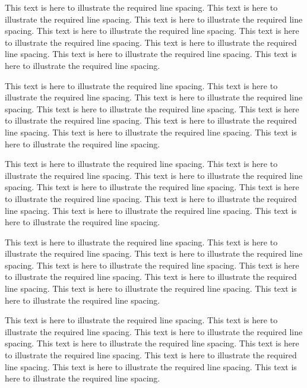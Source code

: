 \documentclass[12pt]{article}
\begin{document}
This text is here to illustrate the required line spacing. This text is here to illustrate the required line spacing. This text is here to illustrate the required line spacing. This text is here to illustrate the required line spacing. This text is here to illustrate the required line spacing. This text is here to illustrate the required line spacing. This text is here to illustrate the required line spacing. This text is here to illustrate the required line spacing.

This text is here to illustrate the required line spacing. This text is here to illustrate the required line spacing. This text is here to illustrate the required line spacing. This text is here to illustrate the required line spacing. This text is here to illustrate the required line spacing. This text is here to illustrate the required line spacing. This text is here to illustrate the required line spacing. This text is here to illustrate the required line spacing.

This text is here to illustrate the required line spacing. This text is here to illustrate the required line spacing. This text is here to illustrate the required line spacing. This text is here to illustrate the required line spacing. This text is here to illustrate the required line spacing. This text is here to illustrate the required line spacing. This text is here to illustrate the required line spacing. This text is here to illustrate the required line spacing.

This text is here to illustrate the required line spacing. This text is here to illustrate the required line spacing. This text is here to illustrate the required line spacing. This text is here to illustrate the required line spacing. This text is here to illustrate the required line spacing. This text is here to illustrate the required line spacing. This text is here to illustrate the required line spacing. This text is here to illustrate the required line spacing.

This text is here to illustrate the required line spacing. This text is here to illustrate the required line spacing. This text is here to illustrate the required line spacing. This text is here to illustrate the required line spacing. This text is here to illustrate the required line spacing. This text is here to illustrate the required line spacing. This text is here to illustrate the required line spacing. This text is here to illustrate the required line spacing.


  
\end{document}
